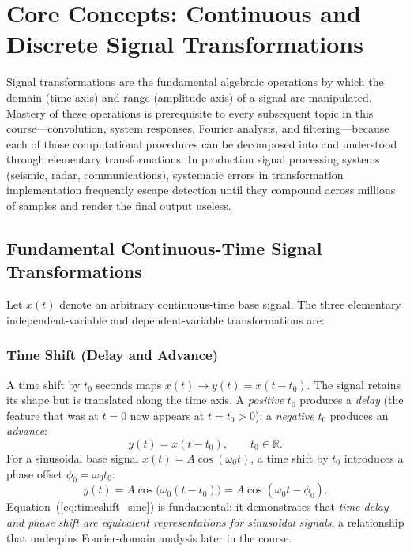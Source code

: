 \documentclass[11pt,letterpaper]{article}
\begin{document}
\section{Core Concepts: Continuous and Discrete Signal Transformations}

Signal transformations are the fundamental algebraic operations by which the domain (time axis) and range (amplitude axis) of a signal are manipulated. Mastery of these operations is prerequisite to every subsequent topic in this course---convolution, system responses, Fourier analysis, and filtering---because each of those computational procedures can be decomposed into and understood through elementary transformations. In production signal processing systems (seismic, radar, communications), systematic errors in transformation implementation frequently escape detection until they compound across millions of samples and render the final output useless.

\subsection{Fundamental Continuous-Time Signal Transformations}

Let $x(t)$ denote an arbitrary continuous-time base signal. The three elementary independent-variable and dependent-variable transformations are:

\subsubsection{Time Shift (Delay and Advance)}
A time shift by $t_0$ seconds maps $x(t) \rightarrow y(t) = x(t - t_0)$. The signal retains its shape but is translated along the time axis. A \emph{positive} $t_0$ produces a \emph{delay} (the feature that was at $t=0$ now appears at $t = t_0 > 0$); a \emph{negative} $t_0$ produces an \emph{advance}:
\begin{equation}
    y(t) = x(t - t_0), \qquad t_0 \in \mathbb{R}.
\end{equation}
For a sinusoidal base signal $x(t) = A\cos(\omega_0 t)$, a time shift by $t_0$ introduces a phase offset $\phi_0 = \omega_0 t_0$:
\begin{equation}
    y(t) = A\cos\!\bigl(\omega_0(t-t_0)\bigr) = A\cos(\omega_0 t - \phi_0).
    \label{eq:timeshift_sine}
\end{equation}
Equation~(\ref{eq:timeshift_sine}) is fundamental: it demonstrates that \emph{time delay and phase shift are equivalent representations for sinusoidal signals}, a relationship that underpins Fourier-domain analysis later in the course.
\end{document}
